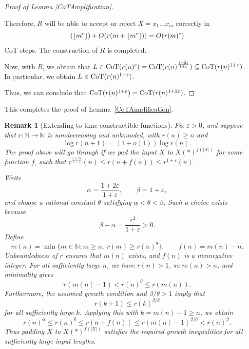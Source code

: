 \documentclass{article}
\let\epsilon\varepsilon
\newtheorem{remark}[theorem]{Remark}
\theoremstyle{definition}
\DeclarePairedDelimiter{\floor}{\lfloor}{\rfloor}
\newcommand{\0}{\mathbf{0}}
\newcommand{\CoT}{\mbox{\rm CoT}}
\newcommand{\1}{\mathbbm{1}}
\begin{document}
\begin{proof}[Proof of Lemma \ref{CoTAmplification}]
\begin{itemize}[noitemsep,leftmargin=10pt,topsep=0pt]
        Therefore, $R$ will be able to accept or reject $X = x_1 \dots x_m$ correctly in 
        $$(\floor{m^c}) + O(r(m + \floor{m^c})) = O(r(m)^c)$$
        CoT steps. The construction of $R$ is completed.      
    \end{itemize}
     
    Now, with $R$, we obtain that $L \in \CoT(r(n)^c) = \CoT(r(n)^{\frac{1 + 2\epsilon}{1 + \epsilon}}) \subseteq \CoT(r(n)^{1 + \epsilon})$. In particular, we obtain $L \in \CoT(r(n)^{1 + \epsilon})$. 
    
    Thus, we can conclude that $\CoT(r(n)^{1 + \epsilon}) = \CoT(r(n)^{1 + 2\epsilon})$. 
\end{proof}
This completes the proof of Lemma~\ref{CoTAmplification}.

\begin{remark}[Extending to time-constructible functions] 

Fix \(\varepsilon>0\), and suppose that \(r:\mathbb N\to\mathbb N\) is nondecreasing and unbounded, with $r(n) \geq n$ and
\[
\log r(n+1)=(1+o(1))\log r(n).
\]
The proof above will go through if we pad the input $X$ to $X (*)^{f(|X|)}$ for some function $f$, such that $r^{\frac{1+2\varepsilon}{1+\varepsilon}}(n) \leq r(n+f(n)) \leq r^{1+\varepsilon}(n)$. 

Write
\[
\alpha=\frac{1+2\varepsilon}{1+\varepsilon},
\qquad
\beta=1+\varepsilon,
\]
and choose a rational constant \(\theta\) satisfying \(\alpha<\theta<\beta\). Such a choice exists because
\[
\beta-\alpha=\frac{\varepsilon^2}{1+\varepsilon}>0.
\]
Define
\[
m(n)=\min\{m\in\mathbb N:m\ge n,\ r(m)\ge r(n)^\theta\},
\qquad
f(n)=m(n)-n.
\]
Unboundedness of \(r\) ensures that \(m(n)\) exists, and \(f(n)\) is a nonnegative integer. For all sufficiently large \(n\), we have \(r(n)>1\), so \(m(n)>n\), and minimality gives
\[
r(m(n)-1)<r(n)^\theta\le r(m(n)).
\]
Furthermore, the assumed growth condition and \(\beta/\theta>1\) imply that
\[
r(k+1)\le r(k)^{\beta/\theta}
\]
for all sufficiently large \(k\). Applying this with \(k=m(n)-1\ge n\), we obtain
\[
r(n)^\alpha
\le r(n)^\theta
\le r(n+f(n))
\le r(m(n)-1)^{\beta/\theta}
<r(n)^\beta.
\]
Thus padding \(X\) to \(X(*)^{f(|X|)}\) satisfies the required growth inequalities for all sufficiently large input lengths.
\end{remark}
\end{document}
